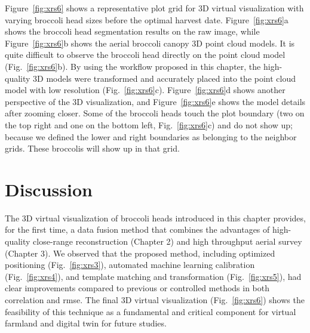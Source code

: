 Figure~\ref{fig:xrs6} shows a representative plot grid for 3D virtual visualization with varying broccoli head sizes before the optimal harvest date. Figure~\ref{fig:xrs6}a shows the broccoli head segmentation results on the raw image, while Figure~\ref{fig:xrs6}b shows the aerial broccoli canopy 3D point cloud models. It is quite difficult to observe the broccoli head directly on the point cloud model (Fig.~\ref{fig:xrs6}b). By using the workflow proposed in this chapter, the high-quality 3D models were transformed and accurately placed into the point cloud model with low resolution (Fig.~\ref{fig:xrs6}c). Figure~\ref{fig:xrs6}d shows another perspective of the 3D visualization, and Figure~\ref{fig:xrs6}e shows the model details after zooming closer. Some of the broccoli heads touch the plot boundary (two on the top right and one on the bottom left, Fig.~\ref{fig:xrs6}c) and do not show up; because we defined the lower and right boundaries as belonging to the neighbor grids. These broccolis will show up in that grid.



\section{Discussion}

The 3D virtual visualization of broccoli heads introduced in this chapter provides, for the first time, a data fusion method that combines the advantages of high-quality close-range reconstruction (Chapter 2) and high throughput aerial survey (Chapter 3). We observed that the proposed method, including optimized positioning (Fig.~\ref{fig:xrs3}), automated machine learning calibration (Fig.~\ref{fig:xrs4}), and template matching and transformation (Fig.~\ref{fig:xrs5}), had clear improvements compared to previous or controlled methods in both correlation and \gls{rmse}. The final 3D virtual visualization (Fig.~\ref{fig:xrs6}) shows the feasibility of this technique as a fundamental and critical component for virtual farmland and digital twin for future studies.

